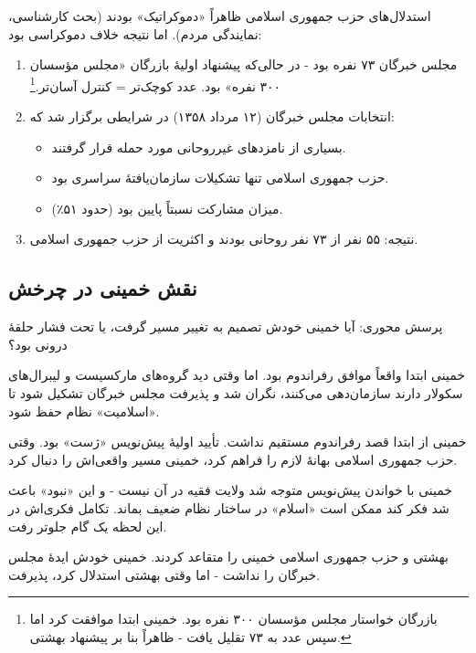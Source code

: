 \documentclass[12pt,a4paper]{book}
\newcommand{\en}[1]{\lr{\textit{#1}}}
\begin{document}
\begin{warningBox}
استدلال‌های حزب جمهوری اسلامی ظاهراً «دموکراتیک» بودند (بحث کارشناسی، نمایندگی مردم). اما نتیجه خلاف دموکراسی بود:

\begin{enumerate}[label=\textcolor{cAccent}{\bfseries\arabic*.}, rightmargin=2em]
    \item مجلس خبرگان ۷۳ نفره بود - در حالی‌که پیشنهاد اولیهٔ بازرگان «مجلس مؤسسان ۳۰۰ نفره» بود. عدد کوچک‌تر = کنترل آسان‌تر.\footnote{بازرگان خواستار مجلس مؤسسان ۳۰۰ نفره بود. خمینی ابتدا موافقت کرد اما سپس عدد به ۷۳ تقلیل یافت - ظاهراً بنا بر پیشنهاد بهشتی. \en{Bakhash (1984), pp.\,72--75.}}
    \item انتخابات مجلس خبرگان (۱۲ مرداد ۱۳۵۸) در شرایطی برگزار شد که:
    \begin{itemize}
        \item بسیاری از نامزدهای غیرروحانی مورد حمله قرار گرفتند.
        \item حزب جمهوری اسلامی تنها تشکیلات سازمان‌یافتهٔ سراسری بود.
        \item میزان مشارکت نسبتاً پایین بود (حدود ۵۱٪).
    \end{itemize}
    \item نتیجه: ۵۵ نفر از ۷۳ نفر روحانی بودند و اکثریت از حزب جمهوری اسلامی.
\end{enumerate}
\end{warningBox}

\subsection{نقش خمینی در چرخش}

پرسش محوری: آیا خمینی خودش تصمیم به تغییر مسیر گرفت، یا تحت فشار حلقهٔ درونی بود؟

\begin{principleBox}
\begin{description}[style=nextline, font=\bfseries\color{cPrimary}]
    \item[تز ۱ (صداقت + اجبار)]
    خمینی ابتدا واقعاً موافق رفراندوم بود. اما وقتی دید گروه‌های مارکسیست و لیبرال‌های سکولار دارند سازمان‌دهی می‌کنند، نگران شد و پذیرفت مجلس خبرگان تشکیل شود تا «اسلامیت» نظام حفظ شود.

    \item[تز ۲ (خدعه)]
    خمینی از ابتدا قصد رفراندوم مستقیم نداشت. تأیید اولیهٔ پیش‌نویس «ژست» بود. وقتی حزب جمهوری اسلامی بهانهٔ لازم را فراهم کرد، خمینی مسیر واقعی‌اش را دنبال کرد.

    \item[تز ۳ (تکامل)]
    خمینی با خواندن پیش‌نویس متوجه شد ولایت فقیه در آن نیست - و این «نبود» باعث شد فکر کند ممکن است «اسلام» در ساختار نظام ضعیف بماند. تکامل فکری‌اش در این لحظه یک گام جلوتر رفت.

    \item[تز ۴ (فشار نخبگان)]
    بهشتی و حزب جمهوری اسلامی خمینی را متقاعد کردند. خمینی خودش ایدهٔ مجلس خبرگان را نداشت - اما وقتی بهشتی استدلال کرد، پذیرفت.
\end{description}
\end{principleBox}
\end{document}
